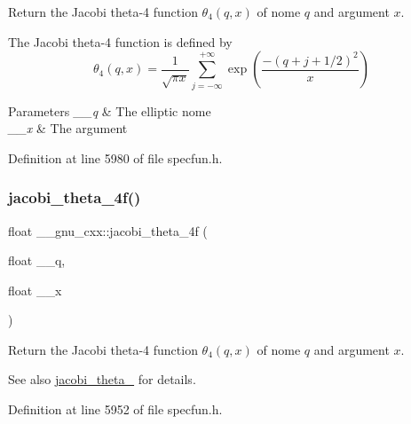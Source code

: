 Return the Jacobi theta-\/4 function $ \theta_4(q,x) $ of nome $ q $ and argument $ x $.

The Jacobi theta-\/4 function is defined by \[ \theta_4(q,x) = \frac{1}{\sqrt{\pi x}} \sum_{j=-\infty}^{+\infty} \exp\left( \frac{-(q + j + 1/2)^2}{x} \right) \]


\begin{DoxyParams}{Parameters}
{\em \+\_\+\+\_\+q} & The elliptic nome \\
\hline
{\em \+\_\+\+\_\+x} & The argument \\
\hline
\end{DoxyParams}


Definition at line 5980 of file specfun.\+h.

\mbox{\label{group__gnu__math__spec__func_ga57dcc5ae4b1a3d1e38adccad85204bca}} 
\subsubsection{\texorpdfstring{jacobi\+\_\+theta\+\_\+4f()}{jacobi\_theta\_4f()}}
{\footnotesize\ttfamily float \+\_\+\+\_\+gnu\+\_\+cxx\+::jacobi\+\_\+theta\+\_\+4f (\begin{DoxyParamCaption}\item[{float}]{\+\_\+\+\_\+q,  }\item[{float}]{\+\_\+\+\_\+x }\end{DoxyParamCaption})\hspace{0.3cm}{\ttfamily [inline]}}

Return the Jacobi theta-\/4 function $ \theta_4(q,x) $ of nome $ q $ and argument $ x $.

\begin{DoxySeeAlso}{See also}
\hyperlink{group__gnu__math__spec__func_ga676501b6284d5702a3dc61252e6c78ab}{jacobi\+\_\+theta\+\_} for details. 
\end{DoxySeeAlso}


Definition at line 5952 of file specfun.\+h.

\mbox{\label{group__gnu__math__spec__func_ga7c2a13198bdfd3f8cf1bc1758b1f56be}} 
